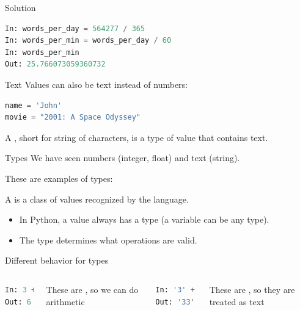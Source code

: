 \documentclass[aspectratio=169,usenames,dvipsnames]{beamer}
\begin{document}
\begin{frame}[fragile]{Solution}
\begin{lstlisting}[language=python]
In: words_per_day = 564277 / 365
In: words_per_min = words_per_day / 60
In: words_per_min
Out: 25.766073059360732
\end{lstlisting}
\end{frame}


\begin{frame}[fragile]{Text}
Values can also be text instead of numbers:
\begin{lstlisting}[language=python]
name = 'John'
movie = "2001: A Space Odyssey"
\end{lstlisting}

\pause
    \begin{definition}
        A , short for string of characters,
        is a type of value that contains text.
    \end{definition}
\end{frame}

\begin{frame}{Types}
    We have seen numbers (integer, float) and text (string).

    These are examples of types:

    \begin{definition}
        A  is a class of values recognized by the language.
    \end{definition}
    
    \pause
    \begin{itemize}
        \item In Python, a value always has a type (a variable can be any type).
        \item The type determines what operations are valid.
    \end{itemize}
\end{frame}

\begin{frame}[fragile]{Different behavior for types}
    \begin{columns}
\begin{lstlisting}[language=python]
In: 3 + 3
Out: 6
\end{lstlisting}

These are , so we can do arithmetic
\begin{lstlisting}[language=python]
In: '3' + '3'
Out: '33'
\end{lstlisting}

These are , so they are treated as text
    \end{columns}
\end{frame}
\end{document}
